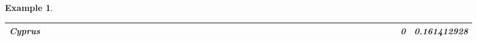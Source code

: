 \documentclass[a4paper,11pt]{report}
\newtheorem{example}[theorem]{Example}
\begin{document}
\begin{example}
\begin{appendices}
\begin{landscape}
\begin{longtable}{r|r|r|r|r|r|r|r|r|r|r|r|r|r|r|r|r|r|r|r|r|r|r|r|r|r|r|r|r|r|r|r|r|r|r|r|r|r|r|r|r|r|r|r|}
\multicolumn{1}{|r|}{\textbf{Cyprus}}          &                                       &                                       &                                       &                                          &                                       &                                       &                                        &                                       &                                      &                                       &                                       &                                                &                                       &                                      &                                       &                                       &                                      &                                       &                                       &                                       &                                      &                                     &                                      &                                         &                                     &                                       &                                          &                                      &                                       &                                      &                                          &                                      &                                        &                                     &                                      &                                           &                                               &                                       &                                              &                                      &                                     & 0                                             & 0.161412928                             \\ \hline

\end{longtable}
\end{landscape}
\end{appendices}
\end{example}
\end{document}
